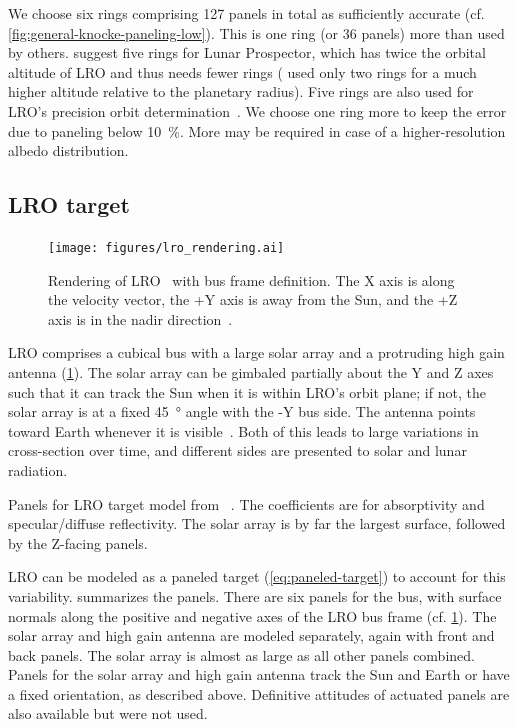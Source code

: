 We choose six rings comprising 127 panels in total as sufficiently accurate (cf. \cref{fig:general-knocke-paneling-low}). This is one ring (or 36 panels) more than used by others. \citeauthor{Floberghagen1999} suggest five rings for Lunar Prospector, which has twice the orbital altitude of \gls{LRO} and thus needs fewer rings (\citeauthor{Knocke1988} used only two rings for a much higher altitude relative to the planetary radius). Five rings are also used for \gls{LRO}'s precision orbit determination~\cite{Nicholson2010}. We choose one ring more to keep the error due to paneling below \qty{10}{\percent}. More may be required in case of a higher-resolution albedo distribution.




\subsection{LRO target}
\label{subsec:lro-target}

\begin{figure}[b]
    \centering
    \texttt{[image: figures/lro\_rendering.ai]}
    \caption{Rendering of \gls{LRO}~\cite{NSMD2018} with bus frame definition. The X axis is along the velocity vector, the +Y axis is away from the Sun, and the +Z axis is in the nadir direction~\cite{Tooley2010}.}
    \label{fig:lro-rendering}
\end{figure}

\gls{LRO} comprises a cubical bus with a large solar array and a protruding high gain antenna (\cref{fig:lro-rendering}). The solar array can be gimbaled partially about the Y and Z axes such that it can track the Sun when it is within \gls{LRO}'s orbit plane; if not, the solar array is at a fixed \qty{45}{\degree} angle with the -Y bus side. The antenna points toward Earth whenever it is visible~\cite{Mazarico2018}. Both of this leads to large variations in cross-section over time, and different sides are presented to solar and lunar radiation.


\begin{table}[t]
    \centering
    \caption{Panels for \gls{LRO} target model from \citeauthor{Smith2008}~\cite{Smith2008}. The coefficients are for absorptivity and specular/diffuse reflectivity. The solar array is by far the largest surface, followed by the Z-facing panels.}
    \label{tab:target-model}
    
\end{table}

\gls{LRO} can be modeled as a paneled target (\cref{eq:paneled-target}) to account for this variability.  summarizes the panels. There are six panels for the bus, with surface normals along the positive and negative axes of the \gls{LRO} bus frame (cf. \cref{fig:lro-rendering}). The solar array and high gain antenna are modeled separately, again with front and back panels. The solar array is almost as large as all other panels combined. Panels for the solar array and high gain antenna track the Sun and Earth or have a fixed orientation, as described above. Definitive attitudes of actuated panels are also available but were not used.

